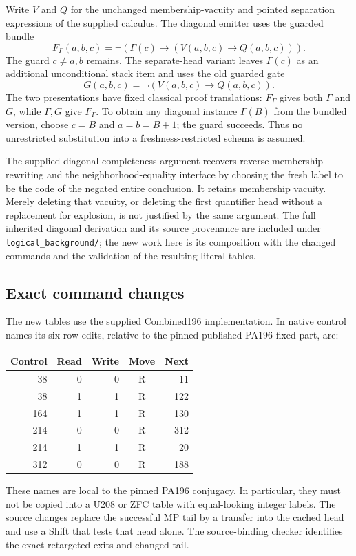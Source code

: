 \documentclass[11pt,a4paper]{article}
\newcommand{\file}[1]{\texttt{\nolinkurl{#1}}}
\begin{document}
Write $V$ and $Q$ for the unchanged membership-vacuity and pointed
separation expressions of the supplied calculus. The diagonal emitter
uses the guarded bundle
\[
 F_\Gamma(a,b,c)=\neg(\Gamma(c)\to(V(a,b,c)\to Q(a,b,c))).
\]
The guard $c\ne a,b$ remains. The separate-head variant leaves
$\Gamma(c)$ as an additional unconditional stack item and uses
the old guarded gate
\[
 G(a,b,c)=\neg(V(a,b,c)\to Q(a,b,c)).
\]
The two presentations have fixed classical proof translations:
$F_\Gamma$ gives both $\Gamma$ and $G$, while $\Gamma,G$ give
$F_\Gamma$. To obtain any diagonal instance $\Gamma(B)$ from the
bundled version, choose $c=B$ and $a=b=B+1$; the guard succeeds.
Thus no unrestricted substitution into a freshness-restricted schema
is assumed.

The supplied diagonal completeness argument recovers reverse
membership rewriting and the neighborhood-equality interface by
choosing the fresh label to be the code of the negated entire
conclusion. It retains membership vacuity. Merely deleting that
vacuity, or deleting the first quantifier head without a replacement
for explosion, is not justified by the same argument. The full inherited
diagonal derivation and its source provenance are included under
\file{logical_background/}; the new work here is its composition with
the changed commands and the validation of the resulting literal tables.

\subsection{Exact command changes}

The new tables use the supplied Combined196 implementation. In native
control names its six row edits, relative to the pinned published
PA196 fixed part, are:
\begin{center}
\begin{tabular}{@{}rrrcr@{}}
\toprule
Control & Read & Write & Move & Next\\
\midrule
38&0&0&R&11\\
38&1&1&R&122\\
164&1&1&R&130\\
214&0&0&R&312\\
214&1&1&R&20\\
312&0&0&R&188\\
\bottomrule
\end{tabular}
\end{center}
These names are local to the pinned PA196 conjugacy. In particular,
they must not be copied into a U208 or ZFC table with equal-looking
integer labels. The source changes replace the successful MP tail
by a transfer into the cached head and use a Shift that tests that
head alone. The source-binding checker identifies the exact retargeted
exits and changed tail.
\end{document}
